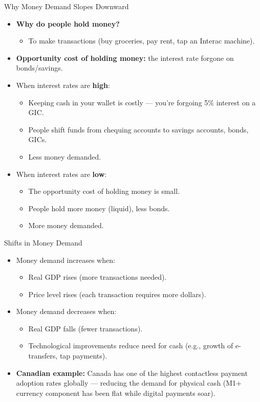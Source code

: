 \documentclass[aspectratio=169]{beamer}
\begin{document}
\begin{frame}{Why Money Demand Slopes Downward}
\transfade
\begin{itemize}
  \item \textbf{Why do people hold money?}
  \begin{itemize}
    \item To make transactions (buy groceries, pay rent, tap an Interac machine).
  \end{itemize}
  \item \textbf{Opportunity cost of holding money:} the interest rate forgone on bonds/savings.
  \item When interest rates are \textbf{high}:
  \begin{itemize}
    \item Keeping cash in your wallet is costly --- you're forgoing 5\% interest on a GIC.
    \item People shift funds from chequing accounts to savings accounts, bonds, GICs.
    \item \alert{Less money demanded}.
  \end{itemize}
  \item When interest rates are \textbf{low}:
  \begin{itemize}
    \item The opportunity cost of holding money is small.
    \item People hold more money (liquid), less bonds.
    \item \alert{More money demanded}.
  \end{itemize}
\end{itemize}
\end{frame}

\begin{frame}{Shifts in Money Demand}
\transfade
\begin{itemize}
  \item Money demand increases when:
  \begin{itemize}
    \item Real GDP rises (more transactions needed).
    \item Price level rises (each transaction requires more dollars).
  \end{itemize}
  \item Money demand decreases when:
  \begin{itemize}
    \item Real GDP falls (fewer transactions).
    \item Technological improvements reduce need for cash (e.g., growth of e-transfers, tap payments).
  \end{itemize}
  \item \textbf{Canadian example:} Canada has one of the highest contactless payment adoption rates globally --- reducing the demand for physical cash (M1+ currency component has been flat while digital payments soar).
\end{itemize}
\end{frame}
\end{document}
